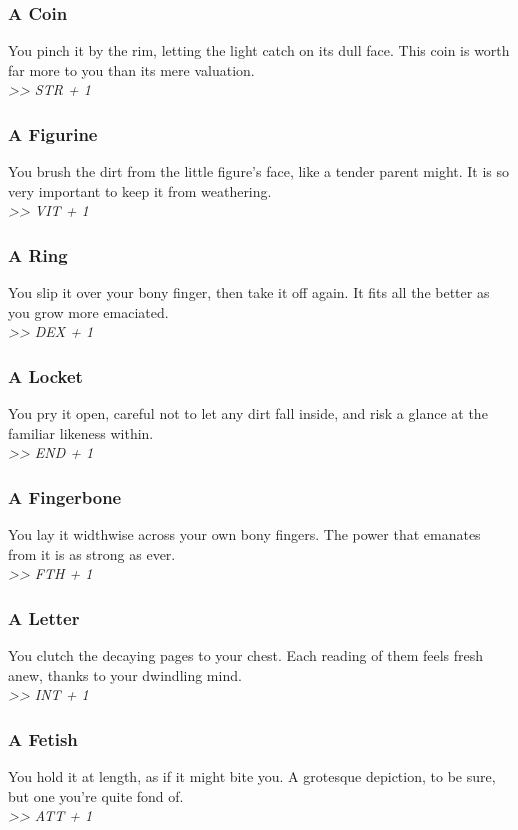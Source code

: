 \begin{multicols}{2}
\subsubsection*{A Coin}
You pinch it by the rim, letting the light catch on its dull face. This coin is worth far more to you than its mere valuation.\\
\emph{>> STR + 1}

\subsubsection*{A Figurine}
You brush the dirt from the little figure’s face, like a tender parent might. It is so very important to keep it from weathering.\\
\emph{>> VIT + 1}

\subsubsection*{A Ring}
You slip it over your bony finger, then take it off again. It fits all the better as you grow more emaciated.\\
\emph{>> DEX + 1}

\subsubsection*{A Locket}
You pry it open, careful not to let any dirt fall inside, and risk a glance at the familiar likeness within.\\
\emph{>> END + 1}

\vspace*{\fill}
\columnbreak

\subsubsection*{A Fingerbone}
You lay it widthwise across your own bony fingers. The power that emanates from it is as strong as ever.\\
\emph{>> FTH + 1}

\subsubsection*{A Letter}
You clutch the decaying pages to your chest. Each reading of them feels fresh anew, thanks to your dwindling mind.\\
\emph{>> INT + 1}

\subsubsection*{A Fetish}
You hold it at length, as if it might bite you. A grotesque depiction, to be sure, but one you’re quite fond of.\\
\emph{>> ATT + 1}


\end{multicols}
